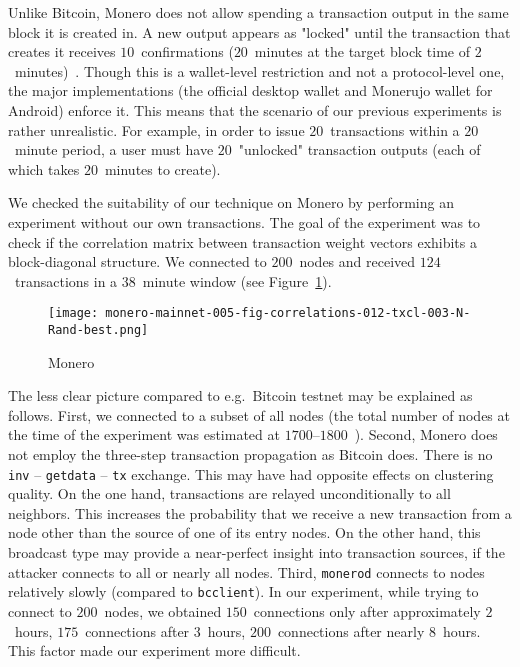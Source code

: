 Unlike Bitcoin, Monero does not allow spending a transaction output in the same block it is created in.
A new output appears as "locked" until the transaction that creates it receives $10$~confirmations ($20$~minutes at the target block time of $2$~minutes)~\cite{dpzz2017}.
Though this is a wallet-level restriction and not a protocol-level one, the major implementations (the official desktop wallet and Monerujo wallet for Android) enforce it.
This means that the scenario of our previous experiments is rather unrealistic.
For example, in order to issue $20$~transactions within a $20$~minute period, a user must have $20$~"unlocked" transaction outputs (each of which takes $20$~minutes to create).

We checked the suitability of our technique on Monero by performing an experiment without our own transactions.
The goal of the experiment was to check if the correlation matrix between transaction weight vectors exhibits a block-diagonal structure.
We connected to $200$~nodes and received $124$~transactions in a $38$~minute window (see Figure~\ref{fig:monero}).

\begin{figure}[!t]
	\centering
	\texttt{[image: monero-mainnet-005-fig-correlations-012-txcl-003-N-Rand-best.png]}
	\caption{Monero}
	\label{fig:monero}
\end{figure}

The less clear picture compared to e.g.~Bitcoin testnet may be explained as follows.
First, we connected to a subset of all nodes (the total number of nodes at the time of the experiment was estimated at $1700$--$1800$~\cite{MoneroHash}).
Second, Monero does not employ the three-step transaction propagation as Bitcoin does.
There is no \texttt{inv} -- \texttt{getdata} -- \texttt{tx} exchange.
This may have had opposite effects on clustering quality.
On the one hand, transactions are relayed unconditionally to all neighbors.
This increases the probability that we receive a new transaction from a node other than the source of one of its entry nodes.
On the other hand, this broadcast type may provide a near-perfect insight into transaction sources, if the attacker connects to all or nearly all nodes.
Third, \texttt{monerod} connects to nodes relatively slowly (compared to \texttt{bcclient}).
In our experiment, while trying to connect to $200$~nodes, we obtained $150$~connections only after approximately $2$~hours, $175$~connections after $3$~hours, $200$~connections after nearly $8$~hours.
This factor made our experiment more difficult.

